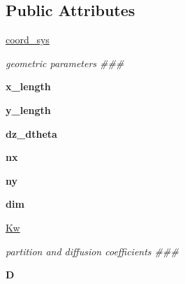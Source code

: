 \subsection*{Public Attributes}
\begin{DoxyCompactItemize}
\item 
\hyperlink{classcomp_1_1Comp_ae00e132d485d50acaf13977284fd9051}{coord\+\_\+sys}\hypertarget{classcomp_1_1Comp_ae00e132d485d50acaf13977284fd9051}{}\label{classcomp_1_1Comp_ae00e132d485d50acaf13977284fd9051}

\begin{DoxyCompactList}\small\item\em geometric parameters \#\#\# \end{DoxyCompactList}\item 
{\bfseries x\+\_\+length}\hypertarget{classcomp_1_1Comp_ab00f0017e7b9e2a1358d200872bc5d45}{}\label{classcomp_1_1Comp_ab00f0017e7b9e2a1358d200872bc5d45}

\item 
{\bfseries y\+\_\+length}\hypertarget{classcomp_1_1Comp_a238a265e564e002cb32f816e588fedda}{}\label{classcomp_1_1Comp_a238a265e564e002cb32f816e588fedda}

\item 
{\bfseries dz\+\_\+dtheta}\hypertarget{classcomp_1_1Comp_a46b24a2ad70c60858be5970dd249e42f}{}\label{classcomp_1_1Comp_a46b24a2ad70c60858be5970dd249e42f}

\item 
{\bfseries nx}\hypertarget{classcomp_1_1Comp_aa57c2e18312b3ff75ca85e5b91630c1e}{}\label{classcomp_1_1Comp_aa57c2e18312b3ff75ca85e5b91630c1e}

\item 
{\bfseries ny}\hypertarget{classcomp_1_1Comp_ac88e268c8aa6dc536ec4d91ced077193}{}\label{classcomp_1_1Comp_ac88e268c8aa6dc536ec4d91ced077193}

\item 
{\bfseries dim}\hypertarget{classcomp_1_1Comp_a5ad617a643f9f0b33d82cb7c774409d3}{}\label{classcomp_1_1Comp_a5ad617a643f9f0b33d82cb7c774409d3}

\item 
\hyperlink{classcomp_1_1Comp_a1ebc8e2cc35684cf7374e5928b01b18d}{Kw}\hypertarget{classcomp_1_1Comp_a1ebc8e2cc35684cf7374e5928b01b18d}{}\label{classcomp_1_1Comp_a1ebc8e2cc35684cf7374e5928b01b18d}

\begin{DoxyCompactList}\small\item\em partition and diffusion coefficients \#\#\# \end{DoxyCompactList}\item 
{\bfseries D}\hypertarget{classcomp_1_1Comp_a6d337679db82dfa988963f6d078901d8}{}\label{classcomp_1_1Comp_a6d337679db82dfa988963f6d078901d8}


\end{DoxyCompactItemize}

